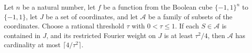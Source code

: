 \begin{theorem}
\label{FABL.card_prefixes_le_goldreichLevinActiveCap}
\leanok
{}
Let $n$ be a natural number, let $f$ be a function from the Boolean cube $\{-1,1\}^n$
to $\{-1,1\}$, let $J$ be a set of coordinates, and let $\mathcal A$ be a family of
subsets of the coordinates. Choose a rational threshold $\tau$ with $0<\tau\le 1$. If
each $S\in\mathcal A$ is contained in $J$, and its restricted Fourier weight on $J$ is
at least $\tau^2/4$, then $\mathcal A$ has cardinality at most $\lceil
4/\tau^2\rceil$.
\end{theorem}
